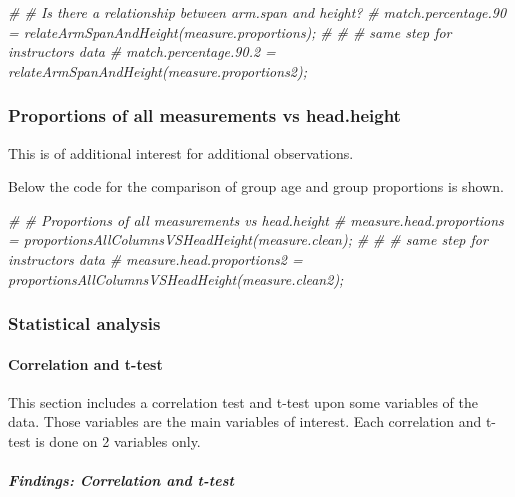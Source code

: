 \documentclass[]{article}
\newenvironment{Shaded}{\begin{snugshade}}{\end{snugshade}}
\newcommand{\CommentTok}[1]{\textcolor[rgb]{0.56,0.35,0.01}{\textit{#1}}}
\begin{document}
\begin{Shaded}
\begin{Highlighting}[]
\CommentTok{\# \# Is there a relationship between arm.span and height?}
\CommentTok{\# match.percentage.90 = relateArmSpanAndHeight(measure.proportions);}
\CommentTok{\# }
\CommentTok{\# \# same step for instructors data}
\CommentTok{\# match.percentage.90.2 = relateArmSpanAndHeight(measure.proportions2);}
\end{Highlighting}
\end{Shaded}

\newpage

\subsubsection{Proportions of all measurements vs head.height}
\label{sec:appendix-proportions}

This is of additional interest for additional observations.

Below the code for the comparison of group age and group proportions is
shown.

\begin{Shaded}
\begin{Highlighting}[]
\CommentTok{\# \# Proportions of all measurements vs head.height}
\CommentTok{\# measure.head.proportions = proportionsAllColumnsVSHeadHeight(measure.clean);}
\CommentTok{\# }
\CommentTok{\# \# same step for instructors data}
\CommentTok{\# measure.head.proportions2 = proportionsAllColumnsVSHeadHeight(measure.clean2);}
\end{Highlighting}
\end{Shaded}

\newpage

\subsubsection{Statistical analysis}
\label{sec:appendix-statistical-analysis}

\paragraph{Correlation and t-test}
\label{sec:appendix-correlation-and-ttest}

This section includes a correlation test and t-test upon some variables
of the data. Those variables are the main variables of interest. Each
correlation and t-test is done on 2 variables only.

\subparagraph{Findings: Correlation and t-test}
\label{sec:appendix-findings-correlation-and-ttest}
\end{document}
